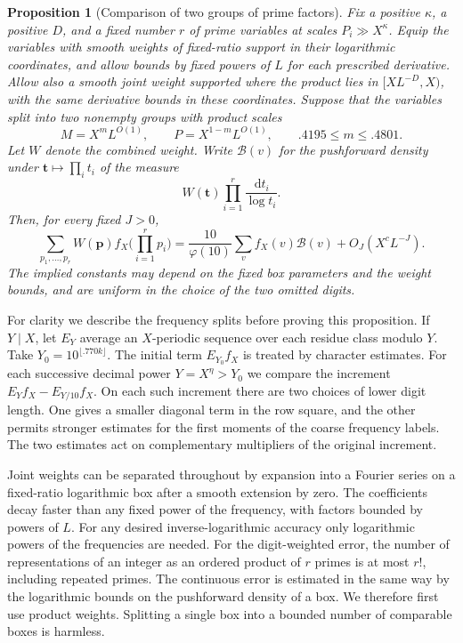 \documentclass[11pt,a4paper]{article}
\theoremstyle{paperplain}
\newtheorem{proposition}[theorem]{Proposition}
\numberwithin{equation}{section}
\newcommand{\dd}{\,\mathrm d}
\begin{document}
\begin{proposition}[Comparison of two groups of prime factors]\label{dt:grouped}
Fix a positive \(\kappa\), a positive \(D\), and a fixed number \(r\) of
prime variables at scales \(P_i\gg X^\kappa\). Equip the variables with
smooth weights of fixed-ratio support in their logarithmic coordinates,
and allow bounds by fixed powers of \(L\) for each prescribed derivative.
Allow also a smooth joint weight supported where the product lies
in \([XL^{-D},X)\), with the same derivative bounds in these coordinates.
Suppose that the variables split into two nonempty groups with product
scales
\[
 M=X^mL^{O(1)},\qquad P=X^{1-m}L^{O(1)},
 \qquad  .4195\le m\le .4801 .
\]
Let \(W\) denote the combined weight. Write \(\mathcal B(v)\) for the
pushforward density under \(\mathbf t\mapsto\prod_i t_i\) of the measure
\[
 W(\mathbf t)\prod_{i=1}^r \frac{\dd t_i}{\log t_i}.
\]
Then, for every fixed \(J>0\),
\begin{equation}\label{dt:box-equation}
 \sum_{p_1,\ldots,p_r}W(\mathbf p)f_X\Big(\prod_{i=1}^r p_i\Big)
   =\frac{10}{\varphi(10)}\sum_{v} f_X(v)\mathcal B(v)
     +O_J(X^cL^{-J}).
\end{equation}
The implied constants may depend on the fixed box parameters and the
weight bounds, and are uniform in the choice of the two omitted digits.
\end{proposition}

For clarity we describe the frequency splits before proving this
proposition. If \(Y\mid X\), let \(E_Y\) average an \(X\)-periodic
sequence over each residue class modulo \(Y\). Take
\(Y_0=10^{\lfloor .770k\rfloor}\). The initial term \(E_{Y_0} f_X\)
is treated by character estimates. For each successive decimal power
\(Y=X^\eta>Y_0\) we compare the increment \(E_Y f_X-E_{Y/10}f_X\).
On each such increment there are two choices of lower digit length.
One gives a smaller diagonal term in the row square, and the other
permits stronger estimates for the first moments of the coarse
frequency labels. The two estimates act on complementary multipliers
of the original increment.

Joint weights can be separated throughout by expansion into a Fourier
series on a fixed-ratio logarithmic box after a smooth extension by
zero. The coefficients decay faster than any fixed power of the
frequency, with factors bounded by powers of \(L\). For any desired
inverse-logarithmic accuracy only logarithmic powers of the
frequencies are needed. For the digit-weighted error, the number of
representations of an integer as an ordered product of \(r\) primes is
at most \(r!\), including repeated primes. The continuous error is
estimated in the same way by the logarithmic bounds on the pushforward
density of a box. We therefore first use product weights. Splitting a
single box into a bounded number of comparable boxes is harmless.
\end{document}
